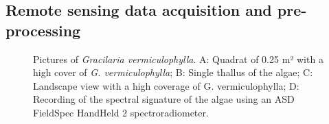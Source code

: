 \documentclass[
  letterpaper,
  DIV=11,
  numbers=noendperiod]{scrartcl}
\begin{document}
\subsection{Remote sensing data acquisition and
pre-processing}\label{sec-DroneFlights}

\label{cell-fig-PictureFigure}
\begin{figure}[H]


\caption{\label{fig-PictureFigure}Pictures of \emph{Gracilaria
vermiculophylla}. A: Quadrat of 0.25 m² with a high cover of \emph{G.
vermiculophylla}; B: Single thallus of the algae; C: Landscape view with
a high coverage of G. vermiculophylla; D: Recording of the spectral
signature of the algae using an ASD FieldSpec HandHeld 2
spectroradiometer.}

\end{figure}%
\end{document}
